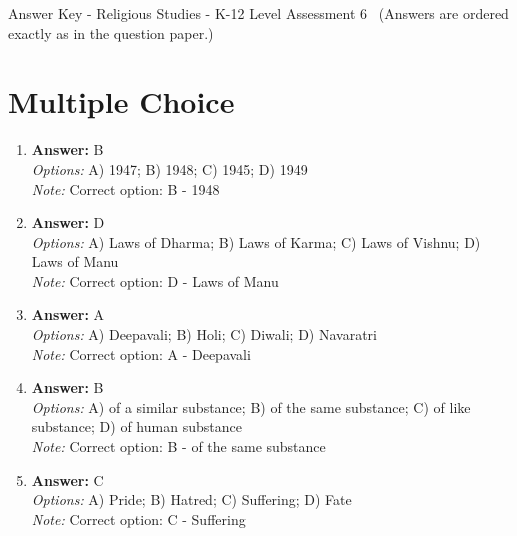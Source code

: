 \documentclass[12pt]{article}
\begin{document}
\begin{center}
Answer Key - Religious Studies - K-12 Level Assessment 6 \
\small (Answers are ordered exactly as in the question paper.)
\end{center}

\section*{Multiple Choice}
\begin{enumerate}[label=\arabic*.]
\item \textbf{Answer:} B
\\ \textit{Options:} A) 1947; B) 1948; C) 1945; D) 1949
\\ \textit{Note:} Correct option: B - 1948
\item \textbf{Answer:} D
\\ \textit{Options:} A) Laws of Dharma; B) Laws of Karma; C) Laws of Vishnu; D) Laws of Manu
\\ \textit{Note:} Correct option: D - Laws of Manu
\item \textbf{Answer:} A
\\ \textit{Options:} A) Deepavali; B) Holi; C) Diwali; D) Navaratri
\\ \textit{Note:} Correct option: A - Deepavali
\item \textbf{Answer:} B
\\ \textit{Options:} A) of a similar substance; B) of the same substance; C) of like substance; D) of human substance
\\ \textit{Note:} Correct option: B - of the same substance
\item \textbf{Answer:} C
\\ \textit{Options:} A) Pride; B) Hatred; C) Suffering; D) Fate
\\ \textit{Note:} Correct option: C - Suffering
\end{enumerate}
\end{document}
